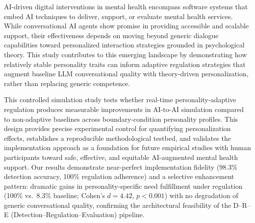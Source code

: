 AI-driven digital interventions in mental health encompass software systems that embed AI techniques to deliver, support, or evaluate mental health services. While conversational AI agents show promise in providing accessible and scalable support, their effectiveness depends on moving beyond generic dialogue capabilities toward personalized interaction strategies grounded in psychological theory. This study contributes to this emerging landscape by demonstrating how relatively stable personality traits can inform adaptive regulation strategies that augment baseline LLM conversational quality with theory-driven personalization, rather than replacing generic competence.

This controlled simulation study tests whether real-time personality-adaptive regulation produces measurable improvements in AI-to-AI simulation compared to non-adaptive baselines across boundary-condition personality profiles. This design provides precise experimental control for quantifying personalization effects, establishes a reproducible methodological testbed, and validates the implementation approach as a foundation for future empirical studies with human participants toward safe, effective, and equitable AI-augmented mental health support. Our results demonstrate near-perfect implementation fidelity (98.3\% detection accuracy, 100\% regulation adherence) and a selective enhancement pattern: dramatic gains in personality-specific need fulfillment under regulation (100\% vs.~8.3\% baseline; Cohen's $d = 4.42$, $p < 0.001$) with no degradation of generic conversational quality, confirming the architectural feasibility of the D--R--E (Detection--Regulation--Evaluation) pipeline.

